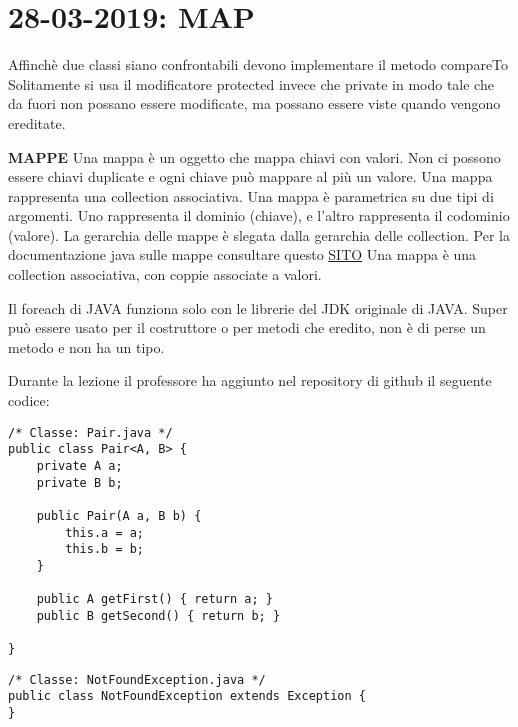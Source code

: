 

\newpage
\section{28-03-2019: MAP}
\noindent Affinchè due classi siano confrontabili devono implementare il metodo compareTo \newline
Solitamente si usa il modificatore protected invece che private in modo tale che da fuori non possano essere modificate, ma possano essere viste quando vengono ereditate. \newline

\noindent \textbf{MAPPE}\newline
Una mappa è un oggetto che mappa chiavi con valori. Non ci possono essere chiavi duplicate e ogni chiave può mappare al più un valore. \newline
Una mappa rappresenta una collection associativa. \newline
Una mappa è parametrica su due tipi di argomenti. Uno rappresenta il dominio (chiave), e l'altro rappresenta il codominio (valore). La gerarchia delle mappe è slegata dalla gerarchia delle collection. \newline
Per la documentazione java sulle mappe consultare questo \href{https://docs.oracle.com/javase/8/docs/api/java/util/Map.html }{SITO} \newline
Una mappa è una collection associativa, con coppie associate a valori.

\noindent Il foreach di JAVA funziona solo con le librerie del JDK originale di JAVA.\newline
Super può essere usato per il costruttore o per metodi che eredito, non è di perse un metodo e non ha un tipo.

\noindent Durante la lezione il professore ha aggiunto nel repository di github il seguente codice: 


\begin{lstlisting}
/* Classe: Pair.java */
public class Pair<A, B> {
    private A a;
    private B b;

    public Pair(A a, B b) {
        this.a = a;
        this.b = b;
    }

    public A getFirst() { return a; }
    public B getSecond() { return b; }

}
\end{lstlisting}

\begin{lstlisting}
/* Classe: NotFoundException.java */
public class NotFoundException extends Exception {
}
\end{lstlisting}

